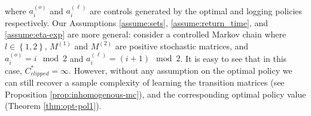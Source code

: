 \documentclass[opre,sglanonrev]{informs4}
\numberwithin{equation}{section}
\newcommand{\pow}[1]{^{(#1)}}
\newcommand{\lc}{\left\{}
\newcommand{\rc}{\right\}}
\begin{document}
{{\begin{align*}
    \end{align*}
 where $a_i\pow o$ and $a_i\pow \ell$ are controls generated by the optimal and logging policies respectively. 
 Our Assumptions \ref{assume:sets}, \ref{assume:return_time}, and \ref{assume:eta-exp} are more general: consider a controlled Markov chain where $l\in\lc  1, 2\rc$, $M\pow 1$ and $M\pow 2$ are positive stochastic matrices, and $a_i\pow o = i\mod 2$ and $a_i \pow \ell = (i+1) \mod 2$. It is easy to see that in this case, $C_{clipped}^*=\infty$. However, without any assumption on the optimal policy we can still recover a sample complexity of learning the transition matrices (see Proposition \ref{prop:inhomogenous-mc}), and the corresponding optimal policy value (Theorem \ref{thm:opt-pol1}). 

}}
\end{document}
